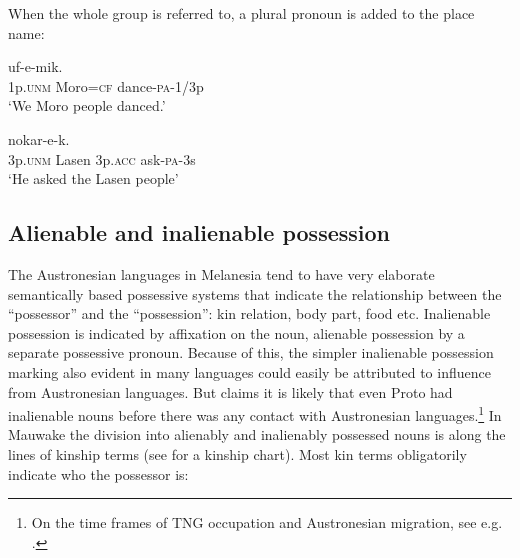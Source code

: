 When the whole group is referred to, a plural pronoun is added to the place name:

\ea%
\label{ex:3:x422}
\gll {}  uf-e-mik. \\
1p.\textsc{unm} Moro=\textsc{cf} dance-\textsc{pa}-1/3p\\
\glt`We Moro people danced.'
\z

\ea%
\label{ex:3:x423}
\gll {}   nokar-e-k.\footnotemark{} \\
3p.\textsc{unm} Lasen 3p.\textsc{acc} ask-\textsc{pa}-3s\\
\glt`He asked the Lasen people'
\z


\subsection{Alienable and inalienable possession}\label{sec:3:2:4}
{}
The Austronesian languages in Melanesia tend to have very elaborate semantically based possessive systems that indicate the relationship between the ``possessor'' and the ``possession'': kin relation, body part, food etc. Inalienable possession is indicated by affixation on the noun, alienable possession by a separate possessive pronoun. Because of this, the simpler inalienable possession marking also evident in many  languages could easily be attributed to influence from Austronesian languages. But \citet[28]{Ross1996} claims it is likely that even Proto  had inalienable nouns before there was any contact with Austronesian languages.\footnote{On the time frames of TNG occupation and Austronesian migration, see e.g. \citet[39--41]{Ross2005}.} In Mauwake the division into alienably and inalienably possessed nouns is along the lines of kinship terms (see  for a kinship chart). Most kin terms obligatorily indicate who the {\textquotedbl}possessor{\textquotedbl} is:

